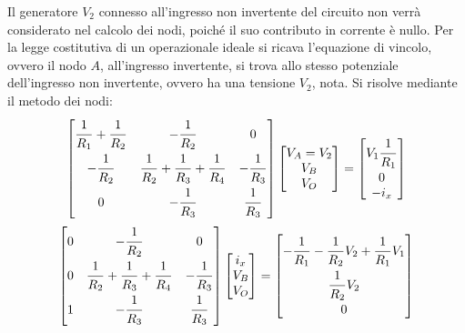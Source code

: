 \documentclass{article}
\begin{document}
Il generatore $V_2$ connesso all'ingresso non invertente del circuito non verrà considerato nel calcolo dei nodi, poiché il suo contributo in corrente è 
nullo. 
Per la legge costitutiva di un operazionale ideale si ricava l'equazione di vincolo, ovvero il nodo $A$, all'ingresso invertente, si trova allo 
stesso potenziale dell'ingresso non invertente, ovvero ha una tensione $V_2$, nota. 
Si risolve mediante il metodo dei nodi:
\begin{gather*}
    \begin{bmatrix}
        \displaystyle\frac{\strut 1}{\strut R_1}+\frac{\strut 1}{\strut R_2}&-\displaystyle\frac{\strut 1}{\strut R_2}&0\\
        -\displaystyle\frac{\strut 1}{\strut R_2}&\displaystyle\frac{\strut 1}{\strut R_2}+\frac{\strut 1}{\strut R_3}+\frac{\strut 1}{\strut R_4}&-\displaystyle\frac{\strut 1}{\strut R_3}\\
        0&-\displaystyle\frac{\strut 1}{\strut R_3}&\displaystyle\frac{\strut 1}{\strut R_3}
    \end{bmatrix}\begin{bmatrix}
        V_A=V_2\\V_B\\V_O
    \end{bmatrix}=\begin{bmatrix}
        V_1\displaystyle\frac{\strut 1}{\strut R_1}\\0\\-i_x
    \end{bmatrix}\\
    \begin{bmatrix}
        0&-\displaystyle\frac{\strut 1}{\strut R_2}&0\\
        0&\displaystyle\frac{\strut 1}{\strut R_2}+\frac{\strut 1}{\strut R_3}+\frac{\strut 1}{\strut R_4}&-\displaystyle\frac{\strut 1}{\strut R_3}\\
        1&-\displaystyle\frac{\strut 1}{\strut R_3}&\displaystyle\frac{\strut 1}{\strut R_3}
    \end{bmatrix}\begin{bmatrix}
        i_x\\V_B\\V_O
    \end{bmatrix}=\begin{bmatrix}
        -\displaystyle\frac{\strut 1}{\strut R_1}-\frac{\strut 1}{\strut R_2}V_2+\frac{\strut 1}{\strut R_1}V_1\\
        \displaystyle\frac{\strut 1}{\strut R_2}V_2\\
        0
    \end{bmatrix}
\end{gather*}
\end{document}
